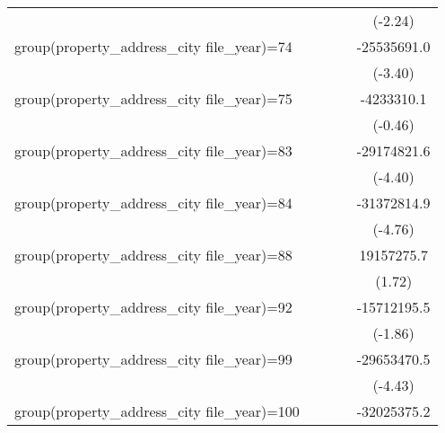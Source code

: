 {\begin{tabular}{l*{4}{c}}
                    &                     &                     &                     &     (-2.24)         \\
\addlinespace
group(property\_address\_city file\_year)=74&                     &                     &                     & -25535691.0\sym{***}\\
                    &                     &                     &                     &     (-3.40)         \\
\addlinespace
group(property\_address\_city file\_year)=75&                     &                     &                     &  -4233310.1         \\
                    &                     &                     &                     &     (-0.46)         \\
\addlinespace
group(property\_address\_city file\_year)=83&                     &                     &                     & -29174821.6\sym{***}\\
                    &                     &                     &                     &     (-4.40)         \\
\addlinespace
group(property\_address\_city file\_year)=84&                     &                     &                     & -31372814.9\sym{***}\\
                    &                     &                     &                     &     (-4.76)         \\
\addlinespace
group(property\_address\_city file\_year)=88&                     &                     &                     &  19157275.7         \\
                    &                     &                     &                     &      (1.72)         \\
\addlinespace
group(property\_address\_city file\_year)=92&                     &                     &                     & -15712195.5         \\
                    &                     &                     &                     &     (-1.86)         \\
\addlinespace
group(property\_address\_city file\_year)=99&                     &                     &                     & -29653470.5\sym{***}\\
                    &                     &                     &                     &     (-4.43)         \\
\addlinespace
group(property\_address\_city file\_year)=100&                     &                     &                     & -32025375.2\sym{***}\\

\end{tabular}}

